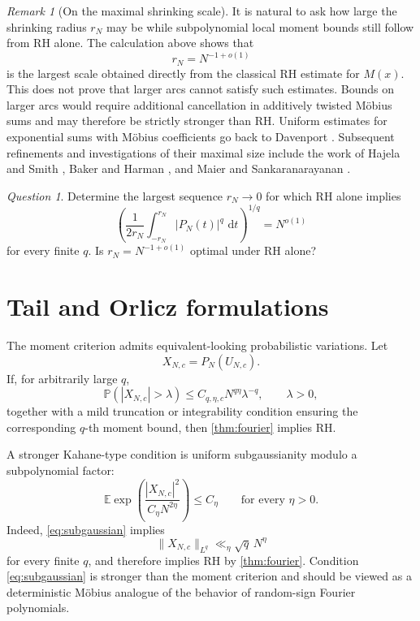 \documentclass[11pt]{article}
\theoremstyle{remark}
\newtheorem{remark}[theorem]{Remark}
\newtheorem{question}[theorem]{Question}
\newcommand{\E}{\mathbb E}
\newcommand{\Pp}{\mathbb P}
\newcommand{\dd}{\,\mathrm d}
\begin{document}
\begin{remark}[On the maximal shrinking scale]
It is natural to ask how large the shrinking radius \(r_N\) may be while
subpolynomial local moment bounds still follow from RH alone.  The
calculation above shows that
\[
 r_N=N^{-1+o(1)}
\]
is the largest scale obtained directly from the classical RH estimate
for \(M(x)\).  This does not prove that larger arcs cannot satisfy such
estimates.  Bounds on larger arcs would require additional cancellation
in additively twisted Möbius sums and may therefore be strictly stronger
than RH.  Uniform estimates for exponential sums with M\"obius coefficients
go back to Davenport \cite{Davenport}.  Subsequent refinements and
investigations of their maximal size include the work of Hajela and
Smith \cite{HajelaSmith}, Baker and Harman \cite{BakerHarman}, and
Maier and Sankaranarayanan \cite{MaierSankaranarayanan}.
\end{remark}


\begin{question}\label{q:max-scale}
Determine the largest sequence \(r_N\to0\) for which RH alone implies
\[
 \left(
 \frac1{2r_N}\int_{-r_N}^{r_N}|P_N(t)|^q\,\dd t
 \right)^{1/q}
 =N^{o(1)}
\]
for every finite \(q\).  Is \(r_N=N^{-1+o(1)}\) optimal under RH
alone?
\end{question}

\section{Tail and Orlicz formulations}
The moment criterion admits equivalent-looking probabilistic
variations.  Let
\[
 X_{N,c}=P_N(U_{N,c}).
\]
If, for arbitrarily large \(q\),
\[
 \Pp(|X_{N,c}|>\lambda)
 \leq C_{q,\eta,c}N^{q\eta}\lambda^{-q},
 \qquad \lambda>0,
\]
together with a mild truncation or integrability condition ensuring
the corresponding \(q\)-th moment bound, then
\cref{thm:fourier} implies RH.

A stronger Kahane-type condition is uniform subgaussianity modulo a
subpolynomial factor:
\begin{equation}\label{eq:subgaussian}
 \E\exp\left(
 \frac{|X_{N,c}|^2}{C_\eta N^{2\eta}}
 \right)
 \leq C_\eta
 \qquad\text{for every }\eta>0.
\end{equation}
Indeed, \eqref{eq:subgaussian} implies
\[
 \|X_{N,c}\|_{L^q}
 \ll_\eta \sqrt q\,N^\eta
\]
for every finite \(q\), and therefore implies RH by
\cref{thm:fourier}.  Condition \eqref{eq:subgaussian} is stronger than
the moment criterion and should be viewed as a deterministic Möbius
analogue of the behavior of random-sign Fourier polynomials.
\end{document}
